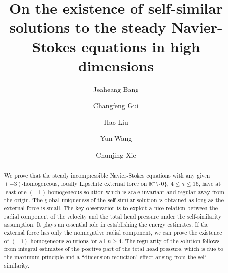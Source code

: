 \documentclass[12pt]{amsart}
\begin{document}
	
	\title
	[Self-similar solutions with  external forces]
	{On the existence of self-similar solutions to the steady Navier-Stokes equations  in high dimensions}
	
	\author{Jeaheang Bang}
	\address{ Institute for Theoretical Sciences, Westlake University, Hangzhou, China}
	
	
	\author{Changfeng Gui}
	\address{Department of Mathematics, Faculty of Science and Technology, University of Macau, Taipa, Macao}
	
	\author{Hao Liu}
	\address{Department of Mathematics, Faculty of Science and Technology, University of Macau, Taipa, Macao}
	
	\author{Yun Wang}
	\address{School of Mathematical Sciences, Center for dynamical systems and differential equations, Soochow University, Suzhou, China}
	
	
	
	
	\author{Chunjing Xie}
	\address{School of Mathematical Sciences, Institute of Natural Sciences,
		Ministry of Education Key Laboratory of Scientific and Engineering Computing,
		and CMA-Shanghai, Shanghai Jiao Tong University, 800 Dongchuan Road, Shanghai, China}
	
	
	\begin{abstract}
		We prove that the steady incompressible Navier-Stokes equations with any given $(-3)$-homogeneous, locally Lipschitz external force on $\mathbb{R}^n\setminus\{0\}$, $4\leq n\leq 16$, have at least one $(-1)$-homogeneous solution which is scale-invariant and regular away from the origin. The global uniqueness of the self-similar solution  is obtained as long as the external force is small.
		The key observation is to exploit a nice relation between the radial component of the velocity and the total head pressure under the self-similarity assumption. It plays an essential role in establishing the energy estimates.  If the external force has only the nonnegative radial component, we can prove the existence of $(-1)$-homogeneous solutions for all $n\geq 4$.
		The regularity of the solution follows from integral estimates of the positive part of the total head pressure, which is due to the maximum principle  and a ``dimension-reduction" effect arising from the self-similarity. 
		
	\end{abstract}
	
\end{document}
